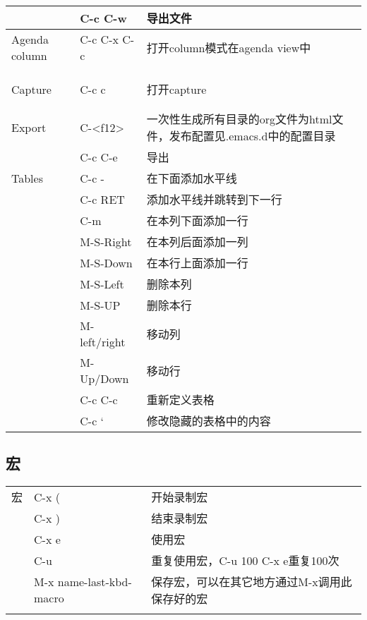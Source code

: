 \documentclass[10pt,a4paper]{article}
\begin{document}
\begin{center}
\begin{tabular}{lll}
 & C-c C-w & 导出文件\\
\hline
Agenda column & C-c C-x C-c & 打开column模式在agenda view中\\
 &  & \\
 &  & \\
 &  & \\
\hline
Capture & C-c c & 打开capture\\
 &  & \\
 &  & \\
\hline
Export & C-<f12> & 一次性生成所有目录的org文件为html文件，发布配置见.emacs.d中的配置目录\\
 & C-c C-e & 导出\\
\hline
Tables & C-c - & 在下面添加水平线\\
 & C-c RET & 添加水平线并跳转到下一行\\
 & C-m & 在本列下面添加一行\\
 & M-S-Right & 在本列后面添加一列\\
 & M-S-Down & 在本行上面添加一行\\
 & M-S-Left & 删除本列\\
 & M-S-UP & 删除本行\\
 & M-left/right & 移动列\\
 & M-Up/Down & 移动行\\
 & C-c C-c & 重新定义表格\\
 & C-c ` & 修改隐藏的表格中的内容\\
\end{tabular}
\end{center}

\subsection{宏}
\label{sec-3-3}
\begin{center}
\begin{tabular}{lll}
\hline
宏 & C-x ( & 开始录制宏\\
 & C-x ) & 结束录制宏\\
 & C-x e & 使用宏\\
 & C-u & 重复使用宏，C-u 100 C-x e重复100次\\
 & M-x name-last-kbd-macro & 保存宏，可以在其它地方通过M-x调用此保存好的宏\\
\hline
 &  & \\
\end{tabular}
\end{center}
\end{document}
